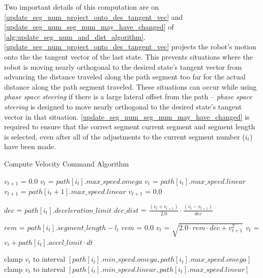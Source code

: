 Two important details of this computation are on \autoref{update_seg_num_project_onto_des_tangent_vec} and \autoref{update_seg_num_seg_num_may_have_changed} of \autoref{alg:update_seg_num_and_dist_algorithm}. \autoref{update_seg_num_project_onto_des_tangent_vec} projects the robot's motion onto the the tangent vector of the last state. This prevents situations where the robot is moving nearly orthogonal to the desired state's tangent vector from advancing the distance traveled along the path segment too far for the actual distance along the path segment traveled. These situations can occur while using \emph{phase space steering} if there is a large lateral offset from the path -- \emph{phase space steering} is designed to move nearly orthogonal to the desired state's tangent vector in that situation. \autoref{update_seg_num_seg_num_may_have_changed} is required to ensure that the correct segment current segment and segment length is selected, even after all of the adjustments to the current segment number ($i_t$) have been made.

\begin{algorithm}
\caption{Compute Velocity Command Algorithm}
\label{alg:compute_velocity_command_algorithm}
\DontPrintSemicolon


{
	$v_{t+1}$ = $0.0$ \;
	$v_t$ = $path\left[i_t\right].max\_speed.omega$ \;
}
{
	$v_t$ = $path\left[i_t\right].max\_speed.linear$ \;
	{
		$v_{t+1}$ = $path\left[i_t + 1 \right].max\_speed.linear$ \;
	}
	{
		$v_{t+1}$ = $0.0$ \;
	}
}

$dec$ = $path\left[i_t\right].deceleration\_limit$ \;
$dec\_dist$ = $\frac{\left( v_t + v_{t+1} \right)}{2.0} \cdot \frac{\left( v_t - v_{t+1} \right)}{dec}$ \;

$rem$ = $path\left[i_t\right].segment\_length - l_t$ \;
{
	$rem$ = $0.0$ \;
}
{
	$v_t$ = $\sqrt{2.0 \cdot rem \cdot dec + v_{t+1}^2}$ \;
}
\Else
{
	$v_t$ = $v_t + path\left[i_t\right].accel\_limit \cdot dt$ \;
}

{
	clamp $v_t$ to interval $\left[ path\left[i_t\right].min\_speed.omega, path\left[i_t\right].max\_speed.omega \right]$ \;
}
{
	clamp $v_t$ to interval $\left[ path\left[i_t\right].min\_speed.linear, path\left[i_t\right].max\_speed.linear \right]$ \;
}

\end{algorithm}

